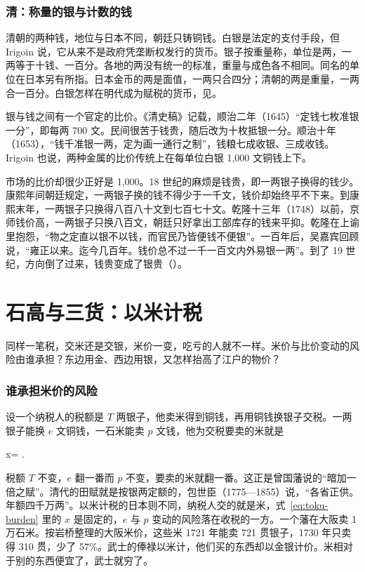 \subsubsection{清：称量的银与计数的钱}
清朝的两种钱，地位与日本不同，朝廷只铸铜钱。白银是法定的支付手段，但 Irigoin 说，它从来不是政府凭垄断权发行的货币。银子按重量称，单位是两，一两等于十钱、一百分。各地的两没有统一的标准，重量与成色各不相同\cite{irigoin2013}。同名的单位在日本另有所指。日本金币的两是面值，一两只合四分；清朝的两是重量，一两合一百分。白银怎样在明代成为赋税的货币，见。

银与钱之间有一个官定的比价。《清史稿》记载，顺治二年（1645）“定钱七枚准银一分”，即每两 700 文。民间很苦于钱贵，随后改为十枚抵银一分。顺治十年（1653），“钱千准银一两，定为画一通行之制”，钱粮七成收银、三成收钱\cite{qingshigao}。Irigoin 也说，两种金属的比价传统上在每单位白银 1,000 文铜钱上下\cite{irigoin2013}。

市场的比价却很少正好是 1,000。18 世纪的麻烦是钱贵，即一两银子换得的钱少。康熙年间朝廷规定，一两银子换的钱不得少于一千文，钱价却始终平不下来。到康熙末年，一两银子只换得八百八十文到七百七十文。乾隆十三年（1748）以前，京师钱价高，一两银子只换八百文，朝廷只好拿出工部库存的钱来平抑\cite{qingshigao}。乾隆在上谕里抱怨，“物之定直以银不以钱，而官民乃皆便钱不便银”\cite{qingshigao}。一百年后，吴嘉宾回顾说，“雍正以来。迄今几百年。钱价总不过一千一百文内外易银一两”\cite{xubiansheng}。到了 19 世纪，方向倒了过来，钱贵变成了银贵（）。

\section{石高与三货：以米计税}\label{sec:toku-koku}

同样一笔税，交米还是交银，米价一变，吃亏的人就不一样。米价与比价变动的风险由谁承担？东边用金、西边用银，又怎样抬高了江户的物价？

\subsubsection{谁承担米价的风险}
设一个纳税人的税额是 $T$ 两银子，他卖米得到铜钱，再用铜钱换银子交税。一两银子能换 $e$ 文铜钱，一石米能卖 $p$ 文钱，他为交税要卖的米就是
\begin{keyeq}
x=\quad{} .\label{eq:toku-burden}
\end{keyeq}
税额 $T$ 不变，$e$ 翻一番而 $p$ 不变，要卖的米就翻一番。这正是曾国藩说的“暗加一倍之赋”。清代的田赋就是按银两定额的，包世臣（1775—1855）说，“各省正供。年额四千万两”\cite{xubiansheng}。以米计税的日本则不同，纳税人交的就是米，式~\eqref{eq:toku-burden} 里的 $x$ 是固定的，$e$ 与 $p$ 变动的风险落在收税的一方。一个藩在大阪卖 1 万石米。按岩桥整理的大阪米价，这些米 1721 年能卖 721 贯银子，1730 年只卖得 310 贯，少了 57\%\cite{iwahashi1981}。武士的俸禄以米计，他们买的东西却以金银计价。米相对于别的东西便宜了，武士就穷了。

